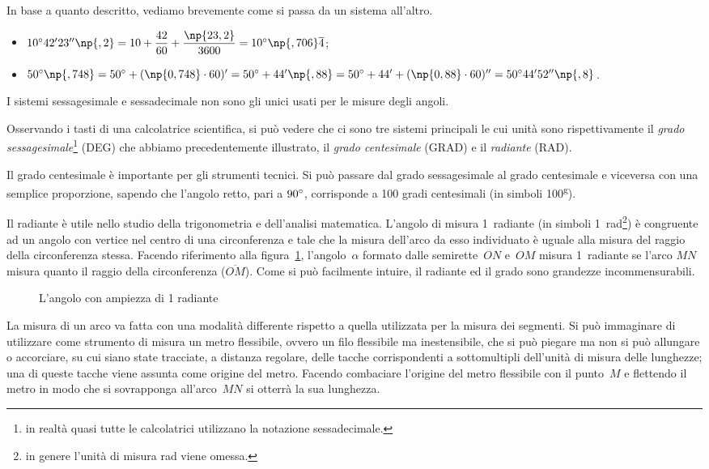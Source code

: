 In base a quanto descritto, vediamo brevemente come si passa da un sistema all'altro.

\begin{itemize}
\item $10\grado 42' 23''\np{,2} = 10+\dfrac{42}{60}+\dfrac{\np{23,2}}{3600} = 10\grado\np{,706}\overline{4}$;
\item $50\grado\np{,748} = 50\grado + (\np{0,748}\cdot 60)'=50\grado + 44'\np{,88} = 50\grado + 44'+(\np{0,88}\cdot 60)'' = 50\grado 44' 52''\np{,8}$.
\end{itemize}

I sistemi sessagesimale e sessadecimale non sono gli unici usati per le misure degli angoli.

Osservando i tasti di una calcolatrice scientifica, si può vedere che ci sono tre sistemi principali le cui unità sono rispettivamente il \emph{grado sessagesimale}\footnote{in realtà quasi tutte le calcolatrici utilizzano la notazione sessadecimale.} (DEG) che abbiamo precedentemente illustrato, il \emph{grado centesimale} (GRAD) e il \emph{radiante} (RAD).

Il grado centesimale è importante per gli strumenti tecnici. Si può passare dal grado sessagesimale al grado centesimale e viceversa con una semplice proporzione, sapendo che l'angolo retto, pari a $90{}^{\circ}$, corrisponde a 100 gradi centesimali (in simboli 100\textsuperscript{g}).

Il radiante è utile nello studio della trigonometria e dell'analisi matematica. L'angolo di misura 1~radiante (in simboli 1~rad\footnote{in genere l'unità di misura rad viene omessa.}) è congruente ad un angolo con vertice nel centro di una circonferenza e tale che la misura dell'arco da esso individuato è uguale alla misura del raggio della circonferenza stessa.
Facendo riferimento alla figura~\ref{fig:radiante}, l'angolo~$\alpha$ formato dalle semirette~$ON$ e~$OM$ misura 1~radiante se l'arco $MN$ misura quanto il raggio della circonferenza ($\overline{OM}$). Come si può facilmente intuire, il radiante ed il grado sono grandezze incommensurabili.

\begin{figure}[htb]
\centering
\caption{L'angolo con ampiezza di 1 radiante}\label{fig:radiante}
\end{figure}

\begin{osservazione}
La misura di un arco va fatta con una modalità differente rispetto a quella utilizzata per la misura dei segmenti. Si può immaginare di utilizzare come strumento di misura un metro flessibile, ovvero un filo flessibile ma inestensibile, che si può piegare ma non si può allungare o accorciare, su cui siano state tracciate, a distanza regolare, delle tacche corrispondenti a sottomultipli dell'unità di misura delle lunghezze; una di queste tacche viene assunta come origine del metro. Facendo combaciare l'origine del metro flessibile con il punto~$M$ e flettendo il metro in modo che si sovrapponga all'arco~$MN$ si otterrà la sua lunghezza.
\end{osservazione}

